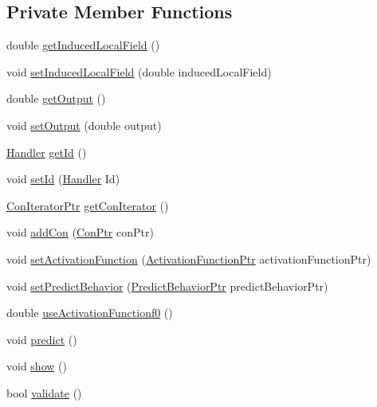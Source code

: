 \subsection*{Private Member Functions}
\begin{DoxyCompactItemize}
\item 
double \hyperlink{class_simple_neuron_ac7d28dffa06f0825c4b7d12e981ce9b1}{getInducedLocalField} ()
\item 
void \hyperlink{class_simple_neuron_a6f0a732980dc4860757b475539085324}{setInducedLocalField} (double inducedLocalField)
\item 
double \hyperlink{class_simple_neuron_ae5a325412827ad1f63e2a75f82023267}{getOutput} ()
\item 
void \hyperlink{class_simple_neuron_af59d76e80aea2bb224b817390f083bf9}{setOutput} (double output)
\item 
\hyperlink{_a_m_o_r_e_8h_abc871abb71cff6655b8172ee7240b8ef}{Handler} \hyperlink{class_simple_neuron_a2ed8cdd977472afaecca2c6b27c6beef}{getId} ()
\item 
void \hyperlink{class_simple_neuron_a7330de5a6a79925b950f78a65c529297}{setId} (\hyperlink{_a_m_o_r_e_8h_abc871abb71cff6655b8172ee7240b8ef}{Handler} Id)
\item 
\hyperlink{_a_m_o_r_e_8h_a819efaf710ead601ac8241df5e235dd8}{ConIteratorPtr} \hyperlink{class_simple_neuron_a53a18c4b7ff06ae1a05eadc7222c7197}{getConIterator} ()
\item 
void \hyperlink{class_simple_neuron_a07d0ec8afcfde17098277e1ff2a5a61d}{addCon} (\hyperlink{_a_m_o_r_e_8h_a169bb8e5f26ce70bf2b10dec2fb5ee50}{ConPtr} conPtr)
\item 
void \hyperlink{class_simple_neuron_a3ccde895829b70bd0f6e42903d469b5f}{setActivationFunction} (\hyperlink{_a_m_o_r_e_8h_a77602a0277a02e5769c3df0adc669b17}{ActivationFunctionPtr} activationFunctionPtr)
\item 
void \hyperlink{class_simple_neuron_a8f230b4566e85adda71c7e0633d8a20d}{setPredictBehavior} (\hyperlink{_a_m_o_r_e_8h_a1fb2f1f8fdf1e08c42ef4bdce436af93}{PredictBehaviorPtr} predictBehaviorPtr)
\item 
double \hyperlink{class_simple_neuron_abf7f3ad2eac82aec49c1521d26521ff2}{useActivationFunctionf0} ()
\item 
void \hyperlink{class_simple_neuron_a232e6c3a7205372e3ccb7e93f26c58b6}{predict} ()
\item 
void \hyperlink{class_simple_neuron_afea22112336409283a5bb7d281f7f4bd}{show} ()
\item 
bool \hyperlink{class_simple_neuron_a9e7173abb892281d0b2ffb0efc82f0e5}{validate} ()
\end{DoxyCompactItemize}


